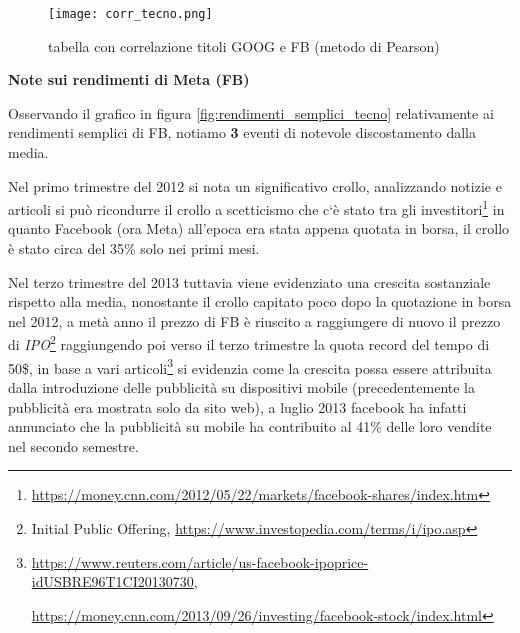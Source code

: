 \begin{figure}[h]
  \centering
  \texttt{[image: corr\_tecno.png]}
  \caption{tabella con correlazione titoli GOOG e FB (metodo di Pearson)}
  \label{fig:corr_tecno}
\end{figure}

\pagebreak

\textbf{Note sui rendimenti di Meta (FB)}

Osservando il grafico in figura \ref{fig:rendimenti_semplici_tecno} relativamente ai rendimenti semplici di FB, notiamo \textbf{3} eventi di notevole discostamento dalla media.

Nel primo trimestre del 2012 si nota un significativo crollo, analizzando notizie e articoli si può ricondurre il crollo a scetticismo che c`è stato
tra gli investitori\footnote{\href{https://money.cnn.com/2012/05/22/markets/facebook-shares/index.htm}{https://money.cnn.com/2012/05/22/markets/facebook-shares/index.htm}} in quanto
Facebook (ora Meta) all'epoca era stata appena quotata in borsa, il crollo è stato circa del 35\% solo nei primi mesi.

Nel terzo trimestre del 2013 tuttavia viene evidenziato una crescita sostanziale rispetto alla media, nonostante il crollo capitato poco dopo la quotazione in borsa nel 2012,
a metà anno il prezzo di FB è riuscito a raggiungere di nuovo il prezzo di \emph{IPO}\footnote{Initial Public Offering, \href{https://www.investopedia.com/terms/i/ipo.asp}{https://www.investopedia.com/terms/i/ipo.asp}}
raggiungendo poi verso il terzo trimestre la quota record del tempo di 50\$, in base a vari 
articoli\footnote{
  \href{https://www.reuters.com/article/us-facebook-ipoprice-idUSBRE96T1CI20130730}{https://www.reuters.com/article/us-facebook-ipoprice-idUSBRE96T1CI20130730},
  
  \hspace{1.5mm} \href{https://money.cnn.com/2013/09/26/investing/facebook-stock/index.html}{https://money.cnn.com/2013/09/26/investing/facebook-stock/index.html}
  }
si evidenzia come la crescita possa essere attribuita dalla introduzione delle pubblicità su dispositivi mobile (precedentemente la pubblicità era mostrata solo da sito web),
a luglio 2013 facebook ha infatti annunciato che la pubblicità su mobile ha contribuito al 41\% delle loro vendite nel secondo semestre.

